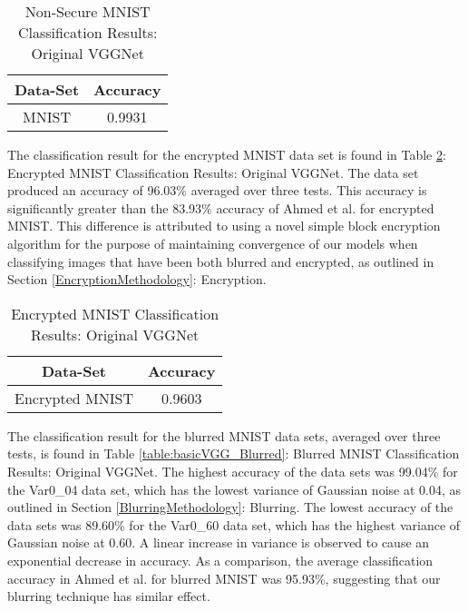 \documentclass[12pt, titlepage]{article}
\begin{document}
\begin{table}[!h]
	\begin{center}
		\begin{tabular}{| c | c |}
			\hline
			\textbf{Data-Set} & \textbf{Accuracy}\\
			\hline
			MNIST & 0.9931\\
			\hline
		\end{tabular}
		\caption{Non-Secure MNIST Classification Results: Original VGGNet}
		\label{table:basicVGG_MNIST}
	\end{center}
\end{table}

\noindent The classification result for the encrypted MNIST data set is found in Table \ref{table:basicVGG_Encryption}: Encrypted MNIST Classification Results: Original VGGNet. The data set produced an accuracy of 96.03\% averaged over three tests. This accuracy is significantly greater than the 83.93\% accuracy of Ahmed et al. for encrypted MNIST. This difference is attributed to using a novel simple block encryption algorithm for the purpose of maintaining convergence of our models when classifying images that have been both blurred and encrypted, as outlined in Section \ref{EncryptionMethodology}: Encryption.\\

\begin{table}[!h]
	\begin{center}
		\begin{tabular}{| c | c |}
			\hline
			\textbf{Data-Set} & \textbf{Accuracy}\\
			\hline
			Encrypted MNIST & 0.9603\\
			\hline
		\end{tabular}
		\caption{Encrypted MNIST Classification Results: Original VGGNet}
		\label{table:basicVGG_Encryption}
	\end{center}
\end{table}

\noindent The classification result for the blurred MNIST data sets, averaged over three tests, is found in Table \ref{table:basicVGG_Blurred}: Blurred MNIST Classification Results: Original VGGNet. The highest accuracy of the data sets was 99.04\% for the Var0\_04 data set, which has the lowest variance of Gaussian noise at 0.04, as outlined in Section \ref{BlurringMethodology}: Blurring. The lowest accuracy of the data sets was 89.60\% for the Var0\_60 data set, which has the highest variance of Gaussian noise at 0.60. A linear increase in variance is observed to cause an exponential decrease in accuracy. As a comparison, the average classification accuracy in Ahmed et al. for blurred MNIST was 95.93\%, suggesting that our blurring technique has similar effect.
\end{document}
